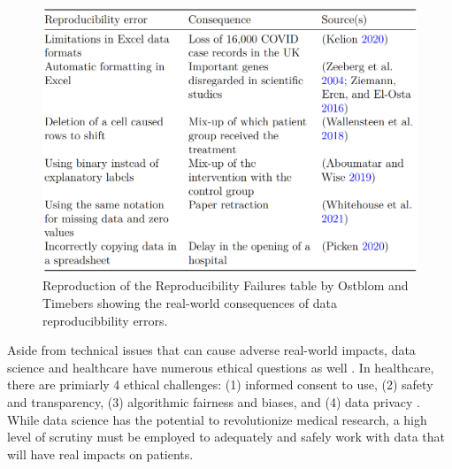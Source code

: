 \documentclass[../main.tex]{subfiles}
\begin{document}
    \begin{figure}[!hbtp]
        \centering
        \includegraphics[scale=0.5]{figs/050-intro/ostblom_timbers-reproducibility_failures.PNG}
        \caption[Reproduction of Reproduciblity Failures]{
        Reproduction of the Reproducibility Failures table
        by Ostblom and Timebers \cite{ostblomOpinionatedPracticesTeaching2021}
        showing the real-world consequences of data reproducibbility errors.
        }
        \label{fig:data_science_consequences}
    \end{figure}

    Aside from technical issues that can cause adverse real-world impacts, data
    science and healthcare have numerous ethical questions as well
    \cite{gerkeEthicalLegalChallenges2020, peekThirtyYearsArtificial2015,
    phannonstanford.eduResearchersSayUse, rigbyEthicalDimensionsUsing2019,
    wetsmanWHOOutlinesPrinciples2021}.
    In healthcare, there are primiarly 4 ethical challenges:
    (1) informed consent to use,
    (2) safety and transparency,
    (3) algorithmic fairness and biases, and
    (4) data privacy
    \cite{gerkeEthicalLegalChallenges2020}.
    While data science has the potential to revolutionize medical research,
    a high level of scrutiny must be employed to adequately and safely work with
    data that will have real impacts on patients.









\end{document}
